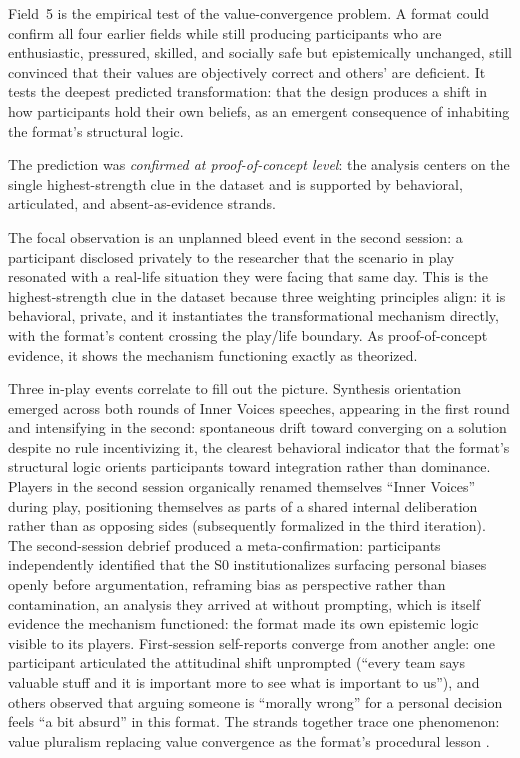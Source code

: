 Field~5 is the empirical test of the value-convergence problem.  A format could confirm all four earlier fields while still producing participants who are enthusiastic, pressured, skilled, and socially safe but epistemically unchanged, still convinced that their values are objectively correct and others' are deficient. It tests the deepest predicted transformation: that the design produces a shift in how participants hold their own beliefs, as an emergent consequence of inhabiting the format's structural logic.

The prediction was \textit{confirmed at proof-of-concept level}: the analysis centers on the single highest-strength clue in the dataset and is supported by behavioral, articulated, and absent-as-evidence strands.

The focal observation is an unplanned bleed event in the second session: a participant disclosed privately to the researcher that the scenario in play resonated with a real-life situation they were facing that same day. This is the highest-strength clue in the dataset because three weighting principles align: it is behavioral, private, and it instantiates the transformational mechanism directly, with the format's content crossing the play/life boundary. As proof-of-concept evidence, it shows the mechanism functioning exactly as theorized.

Three in-play events correlate to fill out the picture. Synthesis orientation emerged across both rounds of Inner Voices speeches, appearing in the first round and intensifying in the second: spontaneous drift toward converging on a solution despite no rule incentivizing it, the clearest behavioral indicator that the format's structural logic orients participants toward integration rather than dominance. Players in the second session organically renamed themselves ``Inner Voices'' during play, positioning themselves as parts of a shared internal deliberation rather than as opposing sides (subsequently formalized in the third iteration). The second-session debrief produced a meta-confirmation: participants independently identified that the S0 institutionalizes surfacing personal biases openly before argumentation, reframing bias as perspective rather than contamination, an analysis they arrived at without prompting, which is itself evidence the mechanism functioned: the format made its own epistemic logic visible to its players. First-session self-reports converge from another angle: one participant articulated the attitudinal shift unprompted (``every team says valuable stuff and it is important more to see what is important to us''), and others observed that arguing someone is ``morally wrong'' for a personal decision feels ``a bit absurd'' in this format. The strands together trace one phenomenon: value pluralism replacing value convergence as the format's procedural lesson \parencite{bogost2007persuasive}.

